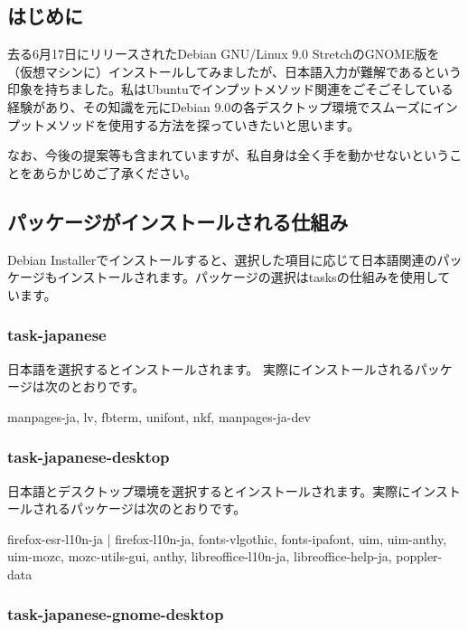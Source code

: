 \documentclass[mingoth,a4paper]{jsarticle}
\begin{document}
\pagebreak

\subsection{はじめに}

去る6月17日にリリースされたDebian GNU/Linux 9.0 StretchのGNOME版を（仮想マシンに）インストールしてみましたが、日本語入力が難解であるという印象を持ちました。私はUbuntuでインプットメソッド関連をごそごそしている経験があり、その知識を元にDebian 9.0の各デスクトップ環境でスムーズにインプットメソッドを使用する方法を探っていきたいと思います。

なお、今後の提案等も含まれていますが、私自身は全く手を動かせないということをあらかじめご了承ください。

\subsection{パッケージがインストールされる仕組み}

Debian Installerでインストールすると、選択した項目に応じて日本語関連のパッケージもインストールされます。パッケージの選択はtasksの仕組みを使用しています。

\subsubsection{task-japanese}

日本語を選択するとインストールされます。
実際にインストールされるパッケージは次のとおりです。
\begin{commandline}
  manpages-ja, lv, fbterm, unifont, nkf, manpages-ja-dev
\end{commandline}

\subsubsection{task-japanese-desktop}

日本語とデスクトップ環境を選択するとインストールされます。実際にインストールされるパッケージは次のとおりです。
\begin{commandline}
  firefox-esr-l10n-ja | firefox-l10n-ja, fonts-vlgothic, fonts-ipafont,
  uim, uim-anthy, uim-mozc, mozc-utils-gui, anthy, libreoffice-l10n-ja, libreoffice-help-ja, poppler-data
\end{commandline}

\subsubsection{task-japanese-gnome-desktop}
\end{document}
